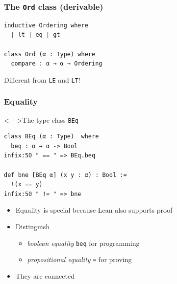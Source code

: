 \documentclass{beamer}
\begin{document}
\begin{frame}[fragile]
  \frametitle{The \texttt{Ord} class (derivable)}
\begin{lstlisting}
inductive Ordering where
  | lt | eq | gt

class Ord (α : Type) where
  compare : α → α → Ordering
\end{lstlisting}
  Different from \lstinline{LE} and \lstinline{LT}!
\end{frame}
\begin{frame}[fragile]
  \frametitle{Equality}
  \begin{block}<+->{The type class \texttt{BEq}}
\begin{lstlisting}
class BEq (α : Type)  where
  beq : α → α -> Bool
infix:50 " == " => BEq.beq

def bne [BEq α] (x y : α) : Bool :=
  !(x == y)
infix:50 " != " => bne
\end{lstlisting}
  \end{block}
  \begin{itemize}
  \item Equality is special because Lean also supports proof
  \item Distinguish
    \begin{itemize}
    \item \emph{boolean equality} \lstinline{beq} for programming
    \item \emph{propositional equality} \lstinline{=} for proving
    \end{itemize}
  \item They are connected
  \end{itemize}
\end{frame}
\end{document}
